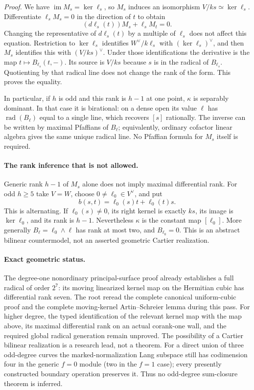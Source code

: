 \emph{Proof.} We have $\operatorname{im}M_s=\ker\ell_s$, so $M_s$
induces an isomorphism $V/ks\simeq\ker\ell_s$. Differentiate
$\ell_sM_s=0$ in the direction of $t$ to obtain
\[
             (d\ell_s(t))M_s+\ell_sM_t=0.
\]
Changing the representative of $d\ell_s(t)$ by a multiple of $\ell_s$
does not affect this equation. Restriction to $\ker\ell_s$ identifies
$W^\vee/k\ell_s$ with $(\ker\ell_s)^\vee$, and then $M_s$ identifies
this with $(V/ks)^\vee$. Under those identifications the derivative is
the map $t\mapsto B_{\ell_s}(t,-)$. Its source is $V/ks$ because
$s$ is in the radical of $B_{\ell_s}$. Quotienting by that radical
line does not change the rank of the form. This proves the equality.

In particular, if $h$ is odd and this rank is $h-1$ at one point,
$\kappa$ is separably dominant. In that case it is birational: on a
dense open its value $\ell$ has $\operatorname{rad}(B_\ell)$ equal
to a single line, which recovers $[s]$ rationally. The inverse can be
written by maximal Pfaffians of $B_\ell$; equivalently, ordinary
cofactor linear algebra gives the same unique radical line. No
Pfaffian formula for $M_s$ itself is required.

\paragraph{The rank inference that is not allowed.}
Generic rank $h-1$ of $M_s$ alone does not imply maximal differential
rank. For odd $h\geq5$ take $V=W$, choose $0\ne\ell_0\in V^\vee$,
and put
\[
                  b(s,t)=\ell_0(s)t+\ell_0(t)s.
\]
This is alternating. If $\ell_0(s)\ne0$, its right kernel is exactly
$ks$, its image is $\ker\ell_0$, and its rank is $h-1$.
Nevertheless $\kappa$ is the constant map $[\ell_0]$.
More generally $B_\ell=\ell_0\wedge\ell$ has rank at most two,
and $B_{\ell_0}=0$. This is an abstract bilinear countermodel, not
an asserted geometric Cartier realization.

\paragraph{Exact geometric status.}
The degree-one nonordinary principal-surface proof already establishes
a full radical of order $2^7$: its moving linearized kernel map on
the Hermitian cubic has differential rank seven. The root reread the
complete canonical uniform-cubic proof and the complete moving-kernel
Artin--Schreier lemma during this pass. For higher degree, the typed
identification of the relevant kernel map with the map above, its
maximal differential rank on an actual corank-one wall, and the
required global radical generation remain unproved. The possibility
of a Cartier bilinear realization is a research lead, not a theorem.
For a direct union of three odd-degree curves the marked-normalization
Lang subspace still has codimension four in the generic $f=0$ module
(two in the $f=1$ case); every presently constructed boundary operation
preserves it. Thus no odd-degree sum-closure theorem is inferred.


